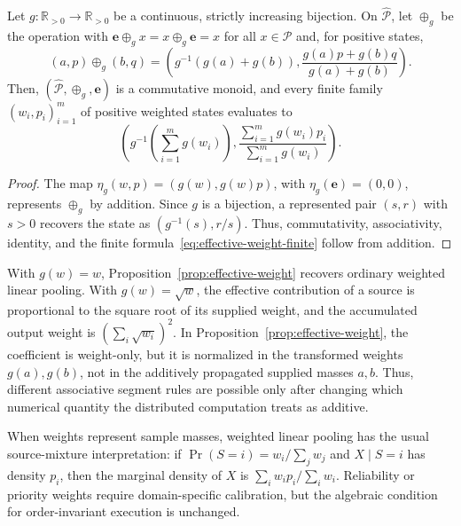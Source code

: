\documentclass[runningheads]{llncs}
\newcommand{\R}{\mathbb{R}}
\newcommand{\Pcal}{\mathcal{P}}
\newcommand{\e}{\mathbf{e}}
\begin{document}
\begin{proposition}\label{prop:effective-weight}
Let $g:\R_{>0}\to\R_{>0}$ be a continuous, strictly increasing bijection. On
$\widehat{\Pcal}$, let $\oplus_g$ be the operation with
$\e\oplus_g x=x\oplus_g\e=x$ for all $x\in\widehat{\Pcal}$ and, for positive states,
\begin{equation}
  (a,p)\oplus_g(b,q) =
  \left(
  g^{-1}(g(a)+g(b)),
  \frac{g(a)p+g(b)q}{g(a)+g(b)}
  \right).
  \label{eq:effective-weight-rule}
\end{equation}
Then, $(\widehat{\Pcal},\oplus_g,\e)$ is a commutative monoid, and every
finite family $(w_i,p_i)_{i=1}^m$ of positive weighted states evaluates to
\begin{equation}
  \left(
  g^{-1}\!\left(\sum_{i=1}^m g(w_i)\right),
  \frac{\sum_{i=1}^m g(w_i)p_i}{\sum_{i=1}^m g(w_i)}
  \right).
  \label{eq:effective-weight-finite}
\end{equation}
\end{proposition}

\begin{proof}
The map $\eta_g(w,p)=(g(w),g(w)p)$, with $\eta_g(\e)=(0,0)$, represents $\oplus_g$ by addition. Since $g$ is a bijection, a represented pair $(s,r)$ with $s>0$ recovers the state as $(g^{-1}(s),r/s)$. Thus, commutativity, associativity, identity, and the finite formula~\eqref{eq:effective-weight-finite} follow from addition.
\end{proof}

With $g(w)=w$, Proposition~\ref{prop:effective-weight} recovers ordinary weighted linear pooling. With $g(w)=\sqrt w$, the effective contribution of a source is proportional to the square root of its supplied weight, and the accumulated output weight is $(\sum_i\sqrt{w_i})^2$. In Proposition~\ref{prop:effective-weight}, the coefficient is weight-only, but it is normalized in the transformed weights $g(a),g(b)$, not in the additively propagated supplied masses $a,b$. Thus, different associative segment rules are possible only after changing which numerical quantity the distributed computation treats as additive.

When weights represent sample masses, weighted linear pooling has the usual source-mixture interpretation: if $\Pr(S=i)=w_i/\sum_jw_j$ and $X\mid S=i$ has density $p_i$, then the marginal density of $X$ is $\sum_iw_ip_i/\sum_iw_i$. Reliability or priority weights require domain-specific calibration, but the algebraic condition for order-invariant execution is unchanged.
\end{document}
